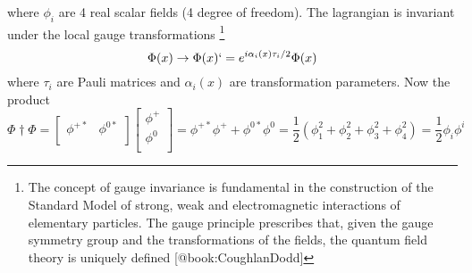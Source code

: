 where $\phi_i$ are 4 real scalar fields (4 degree of freedom). The lagrangian is invariant under the local gauge transformations \footnote{The concept of gauge invariance is fundamental in the construction of the Standard Model of strong, weak and electromagnetic interactions of elementary particles. The gauge principle prescribes that, given the gauge symmetry group and the transformations of the fields, the quantum field theory is uniquely defined [@book:CoughlanDodd]}
    \begin{equation}
    \Phi (x) \rightarrow \Phi(x)`=e^{i\alpha_i(x)\tau_i /2}\Phi(x)
    \end{equation}
where $\tau_i$ are Pauli matrices and $\alpha_i(x)$ are transformation parameters.
Now the product
    \begin{equation}\label{mat1}
    \Phi{\dagger}\Phi=
        \begin{bmatrix}
        \phi^{+*}   &   \phi^{0*} \\
        \end{bmatrix}
        \begin{bmatrix}
        \phi^+  \\
        \phi^0  \\
        \end{bmatrix}
    =\phi^{+*} \phi^+ + \phi^{0*}\phi^0
    =\frac{1}{2}(\phi^2_1+\phi^2_2+\phi^2_3+\phi^2_4)
    =\frac{1}{2}\phi_i \phi^i
    \end{equation}
    
